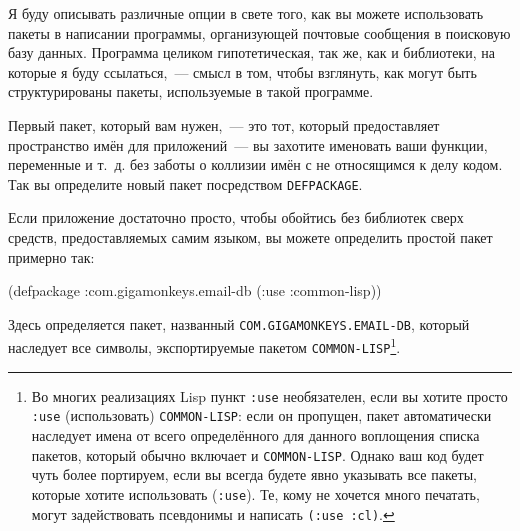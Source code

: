 Я буду описывать различные опции в свете того, как вы можете использовать пакеты в
написании программы, организующей почтовые сообщения в поисковую базу данных. Программа
целиком гипотетическая, так же, как и библиотеки, на которые я буду ссылаться,~--- смысл в
том, чтобы взглянуть, как могут быть структурированы пакеты, используемые в такой
программе.

Первый пакет, который вам нужен,~--- это тот, который предоставляет пространство имён для
приложений~--- вы захотите именовать ваши функции, переменные и т.~д. без заботы о
коллизии имён с не относящимся к делу кодом. Так вы определите новый пакет посредством
\lstinline{DEFPACKAGE}.

Если приложение достаточно просто, чтобы обойтись без библиотек сверх средств,
предоставляемых самим языком, вы можете определить простой пакет примерно так:

\begin{myverb}
(defpackage :com.gigamonkeys.email-db
  (:use :common-lisp))
\end{myverb}

Здесь определяется пакет, названный \lstinline{COM.GIGAMONKEYS.EMAIL-DB}, который наследует все
символы, экспортируемые пакетом \lstinline{COMMON-LISP}\footnote{Во многих реализациях Lisp
  пункт \lstinline{:use} необязателен, если вы хотите просто \lstinline{:use} (использовать)
  \lstinline{COMMON-LISP}: если он пропущен, пакет автоматически наследует имена от всего
  определённого для данного воплощения списка пакетов, который обычно включает и
  \lstinline{COMMON-LISP}. Однако ваш код будет чуть более портируем, если вы всегда будете
  явно указывать все пакеты, которые хотите использовать (\lstinline{:use}). Те, кому
  не хочется много печатать, могут задействовать псевдонимы и написать \lstinline{(:use :cl)}.}\hspace{\footnotenegspace}.

